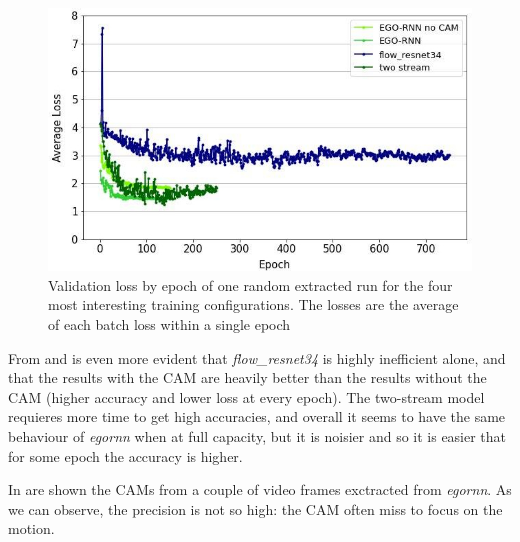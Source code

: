 \documentclass[10pt,twocolumn,hidelinks,letterpaper]{article}
\begin{document}
\begin{figure}[t]
	\centering
	\includegraphics[width=\linewidth]{images/step1_loss.jpg}
	\caption{Validation loss by epoch of one random extracted run for the four most interesting training configurations. The losses are the average of each batch loss within a single epoch}
	\label{step1_loss}
\end{figure}

From  and  is even more evident that \textit{flow\_resnet34} is highly inefficient alone, and that the results with the CAM are heavily better than the results without the CAM (higher accuracy and lower loss at every epoch). The two-stream model requieres more time to get high accuracies, and overall it seems to have the same behaviour of \textit{egornn} when at full capacity, but it is noisier and so it is easier that for some epoch the accuracy is higher.

In  are shown the CAMs from a couple of video frames exctracted from \textit{egornn}. As we can observe, the precision is not so high: the CAM often miss to focus on the motion.
\end{document}
